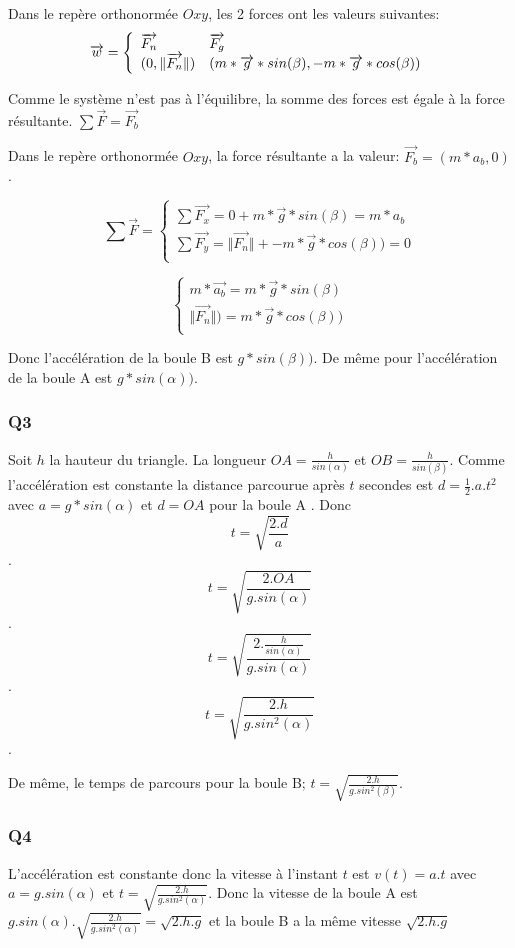 \documentclass[]{book}
\theoremstyle{definition}
\begin{document}
Dans le rep\`ere orthonorm\'ee $Oxy$, les 2 forces ont les valeurs suivantes:
$$\overrightarrow{w} = 
\left\{ 
\begin{array}{l l}
\overrightarrow{F_n}  & \overrightarrow{F_g} \\ 
 (0, \Vert \overrightarrow{F_n} \Vert) & (m*\overrightarrow{g}*sin(\beta), -m*\overrightarrow{g}*cos(\beta)) \\
\end{array}
\right. 
$$

Comme le syst\`eme n'est pas \`a l'\'equilibre, la somme des forces est \'egale \`a la force r\'esultante.
$ \sum{\overrightarrow{F}} = \overrightarrow{F_b}$

Dans le rep\`ere orthonorm\'ee $Oxy$, la force r\'esultante a la valeur: 
$ \overrightarrow{F_b} = (m*a_b, 0)$.

$$\sum{\overrightarrow{F}} = 
\left\{ 
\begin{array}{l}
\sum{\overrightarrow{F_x}} =  0 + m*\overrightarrow{g}*sin(\beta) = m*a_b \\
\sum{\overrightarrow{F_y}} = \Vert \overrightarrow{F_n} \Vert + -m*\overrightarrow{g}*cos(\beta)) = 0\\
\end{array}
\right.
$$

$$
\left\{ 
\begin{array}{l}
m * \overrightarrow{a_b} = m*\overrightarrow{g}*sin(\beta) \\
\Vert \overrightarrow{F_n} \Vert) = m*\overrightarrow{g}*cos(\beta)) \\
\end{array}
\right. 
$$

Donc l'acc\'el\'eration de la boule B est $g*sin(\beta))$.
De m\^eme pour l'acc\'el\'eration de la boule A est $g*sin(\alpha))$.

\subsubsection*{Q3}
Soit $h$ la hauteur du triangle. La longueur $OA = \frac{h}{sin(\alpha)}$ et $OB = \frac{h}{sin(\beta)}$. Comme l'acc\'el\'eration est constante 
la distance parcourue apr\`es $t$ secondes est $d = \frac{1}{2}.a.t^2$ avec $a = g*sin(\alpha)$ et $d = OA$ pour la boule A . Donc
$$ t = \sqrt{\frac{2.d}{a}}$$.
$$ t = \sqrt{\frac{2.OA}{g.sin(\alpha)}}$$.
$$ t = \sqrt{\frac{2.\frac{h}{sin(\alpha)}}{g.sin(\alpha)}}$$.
$$ t = \sqrt{\frac{2.h}{g.sin^2(\alpha)}}$$.

De m\^eme, le temps de parcours pour la boule B; $ t = \sqrt{\frac{2.h}{g.sin^2(\beta)}}$.
  

\subsubsection*{Q4}
L'acc\'el\'eration est constante donc la vitesse \`a l'instant $t$ est $v(t) = a.t$ avec $a = g.sin(\alpha)$ et $ t = \sqrt{\frac{2.h}{g.sin^2(\alpha)}}$.
Donc la vitesse de la boule A est $g.sin(\alpha) . \sqrt{\frac{2.h}{g.sin^2(\alpha)}} = \sqrt{2.h.g}$ et la boule B a la m\^eme vitesse $\sqrt{2.h.g}$
\end{document}

